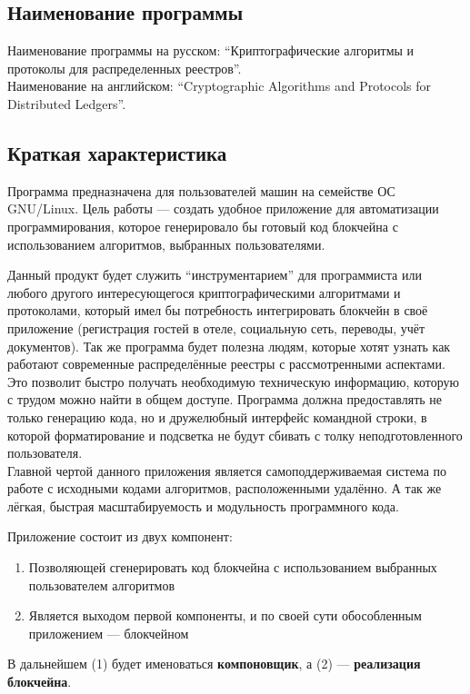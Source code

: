 \subsection{Наименование программы}
Наименование программы на русском:
``Криптографические алгоритмы и протоколы для распределенных реестров''. \\
Наименование на английском:
``Cryptographic Algorithms and Protocols for Distributed Ledgers''. \\


\subsection{Краткая характеристика}
Программа предназначена для пользователей машин на семействе ОС GNU/Linux.
Цель работы --- создать удобное приложение для автоматизации программирования,
которое генерировало бы готовый код блокчейна с использованием алгоритмов,
выбранных пользователями.

Данный продукт будет служить ``инструментарием'' для программиста или любого
другого интересующегося криптографическими алгоритмами и протоколами, который
имел бы потребность интегрировать блокчейн в своё приложение (регистрация
гостей в отеле, социальную сеть, переводы, учёт документов). Так же программа
будет полезна людям, которые хотят узнать как работают современные
распределённые реестры с рассмотренными
аспектами. Это позволит быстро получать необходимую техническую информацию,
которую с трудом можно найти в общем доступе. Программа должна предоставлять не
только генерацию кода, но и дружелюбный интерфейс командной строки, в которой
форматирование и подсветка не будут сбивать с толку неподготовленного
пользователя.\\

Главной чертой данного приложения является самоподдерживаемая система по работе
с исходными кодами алгоритмов, расположенными удалённо. А так же лёгкая,
быстрая масштабируемость и модульность программного кода.

Приложение состоит из двух компонент:
\begin{enumerate}
    \item Позволяющей сгенерировать код блокчейна с использованием выбранных
          пользователем алгоритмов
    \item Является выходом первой компоненты, и по своей сути обособленным приложением --- блокчейном
\end{enumerate}

В дальнейшем (1) будет именоваться \textbf{компоновщик}, а (2) --- \textbf{реализация блокчейна}. 
